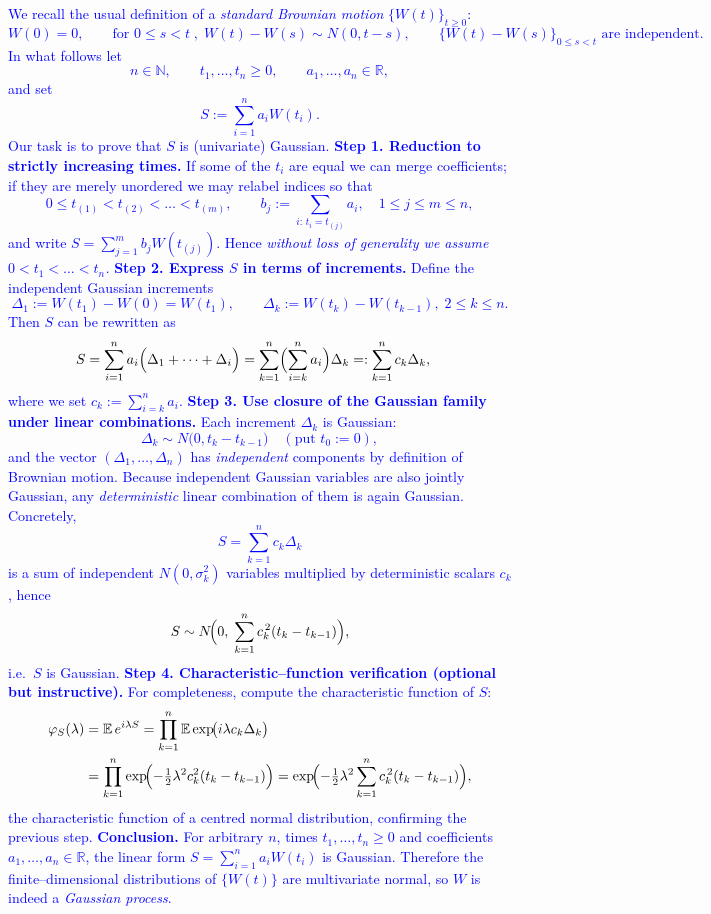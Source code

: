 \documentclass{article}
\begin{document}
\textcolor{blue}{
We recall the usual definition of a \emph{standard Brownian motion} $\{W(t)\}_{t\ge0}$:
$$
W(0)=0,\qquad
\text{for }0\le s<t\;,\;W(t)-W(s)\sim N(0,t-s),\qquad
\{W(t)-W(s)\}_{0\le s<t}\text{ are independent}.
$$
In what follows let  
$$
n\in\mathbb N,\qquad
t_1,\dots,t_n\ge0,\qquad
a_1,\dots,a_n\in\mathbb R,
$$  
and set  
$$
S:=\sum_{i=1}^{n}a_iW(t_i).
$$  
Our task is to prove that $S$ is (univariate) Gaussian.
\bigskip
\textbf{Step 1.  Reduction to strictly increasing times.}  
If some of the $t_i$ are equal we can merge coefficients; if they are merely unordered we may relabel indices so that
$$
0\le t_{(1)}<t_{(2)}<\dots<t_{(m)},\qquad
b_j:=\sum_{i:\,t_i=t_{(j)}}a_i,\quad 1\le j\le m\le n,
$$
and write $S=\sum_{j=1}^{m}b_jW(t_{(j)})$.  
Hence \emph{without loss of generality we assume $0<t_1<\dots<t_n$.}
\bigskip
\textbf{Step 2.  Express $S$ in terms of increments.}  
Define the independent Gaussian increments
$$
\Delta_1:=W(t_1)-W(0)=W(t_1),\qquad
\Delta_k:=W(t_k)-W(t_{k-1}),\;2\le k\le n.
$$
Then $S$ can be rewritten as
$$
\begin{aligned}
S
&=\sum_{i=1}^{n}a_i\Bigl(\Delta_1+\cdots+\Delta_i\Bigr)
 =\sum_{k=1}^{n}\Bigl(\sum_{i=k}^{n}a_i\Bigr)\Delta_k
 =:\sum_{k=1}^{n}c_k\Delta_k,
\end{aligned}
$$
where we set $c_k:=\sum_{i=k}^{n}a_i$.
\bigskip
\textbf{Step 3.  Use closure of the Gaussian family under linear combinations.}  
Each increment $\Delta_k$ is Gaussian:
$$
\Delta_k\sim N\bigl(0,t_k-t_{k-1}\bigr)\quad(\text{put }t_0:=0),
$$
and the vector $(\Delta_1,\dots,\Delta_n)$ has \emph{independent} components by definition of Brownian motion.  
Because independent Gaussian variables are also jointly Gaussian, any \emph{deterministic} linear combination of them is again Gaussian.  Concretely,
$$
S=\sum_{k=1}^{n}c_k\Delta_k
$$
is a sum of independent $N(0,\sigma_k^2)$ variables multiplied by deterministic scalars $c_k$, hence
$$
S\sim N\!\Bigl(0,\;\sum_{k=1}^{n}c_k^{\,2}(t_k-t_{k-1})\Bigr),
$$
i.e.\ $S$ is Gaussian.
\bigskip
\textbf{Step 4.  Characteristic–function verification (optional but instructive).}
For completeness, compute the characteristic function of $S$:
$$
\begin{aligned}
\varphi_S(\lambda)
&=\mathbb E\,e^{i\lambda S}
 =\prod_{k=1}^{n}\mathbb E\exp\!\bigl(i\lambda c_k\Delta_k\bigr)\\
&=\prod_{k=1}^{n}\exp\!\Bigl(-\tfrac12\lambda^{2}c_k^{2}(t_k-t_{k-1})\Bigr)
 =\exp\!\Bigl(-\tfrac12\lambda^{2}\sum_{k=1}^{n}c_k^{\,2}(t_k-t_{k-1})\Bigr),
\end{aligned}
$$
the characteristic function of a centred normal distribution, confirming the previous step.
\bigskip
\textbf{Conclusion.}  For arbitrary $n$, times $t_1,\dots,t_n\ge0$ and coefficients $a_1,\dots,a_n\in\mathbb R$, the linear form $S=\sum_{i=1}^{n}a_iW(t_i)$ is Gaussian.  Therefore the finite–dimensional distributions of $\{W(t)\}$ are multivariate normal, so $W$ is indeed a \emph{Gaussian process}.
}
\end{document}

